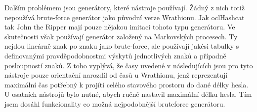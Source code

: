 Dalším problémem jsou generátory, které nástroje používají. Žádný z nich totiž nepoužívá
 brute-force generátor jako původní verze Wrathionu. Jak oclHashcat tak John the
Ripper mají pouze nějakou imitaci tohoto typu generátoru. Ve skutečnosti však používají generátor
založený na Markovských procesech. Ty nejdou lineárně znak po znaku jako brute-force, ale
používají jakési tabulky s definovanými pravděpodobnostmi výskytů jednotlivých znaků a případně
posloupností znaků. Z toho vyplývá, že časy uvedené v následujících jsou pro tyto nástroje pouze
orientační narozdíl od časů u Wrathionu, jenž reprezentují maximální čas potřebný k projítí
celého stavového prostoru do dané délky hesla. U osatních nástrojů bylo nutné, abych ručně
nastavil maximální délku hesla. Tím jsem dosáhl funkcionality co možná nejpodobnější brute\-force
generátoru.
\shorthandoff{-}
